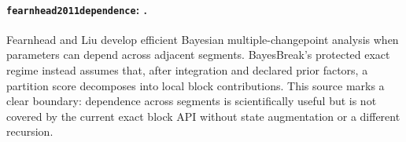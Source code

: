 
\paragraph{\texttt{fearnhead2011dependence}: \citet{fearnhead2011dependence}.}
Fearnhead and Liu develop efficient Bayesian multiple-changepoint analysis when parameters can depend across adjacent segments. BayesBreak's protected exact regime instead assumes that, after integration and declared prior factors, a partition score decomposes into local block contributions. This source marks a clear boundary: dependence across segments is scientifically useful but is not covered by the current exact block API without state augmentation or a different recursion.
